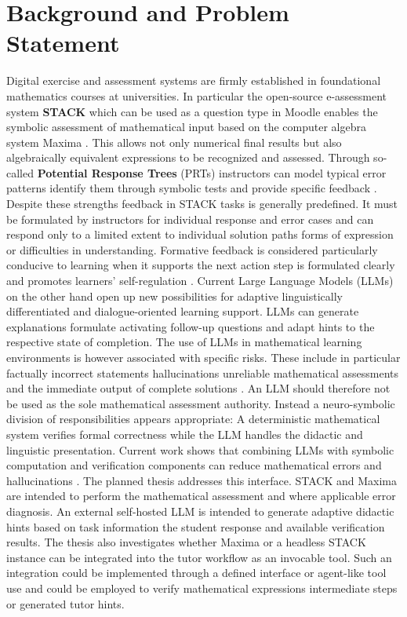 \documentclass[11pt,a4paper,oneside,ngerman]{memoir}
\begin{document}
\chapter{Background and Problem Statement}
Digital exercise and assessment systems are firmly established in foundational mathematics courses at universities. In particular the open-source e-assessment system \textbf{STACK} which can be used as a question type in Moodle enables the symbolic assessment of mathematical input based on the computer algebra system Maxima \autocite{sangwin2013computer,stackdocumentation}. This allows not only numerical final results but also algebraically equivalent expressions to be recognized and assessed. Through so-called \textbf{Potential Response Trees} (PRTs) instructors can model typical error patterns identify them through symbolic tests and provide specific feedback \autocite{stackdocumentation}.
Despite these strengths feedback in STACK tasks is generally predefined. It must be formulated by instructors for individual response and error cases and can respond only to a limited extent to individual solution paths forms of expression or difficulties in understanding. Formative feedback is considered particularly conducive to learning when it supports the next action step is formulated clearly and promotes learners' self-regulation \autocite{hattie2007feedback,shute2008feedback,nicol2006formative}. Current Large Language Models (LLMs) on the other hand open up new possibilities for adaptive linguistically differentiated and dialogue-oriented learning support. LLMs can generate explanations formulate activating follow-up questions and adapt hints to the respective state of completion.
The use of LLMs in mathematical learning environments is however associated with specific risks. These include in particular factually incorrect statements hallucinations unreliable mathematical assessments and the immediate output of complete solutions \autocite{kasneci2023chatgpt,[IBAN_REDACTED],nye2023generative}. An LLM should therefore not be used as the sole mathematical assessment authority. Instead a neuro-symbolic division of responsibilities appears appropriate: A deterministic mathematical system verifies formal correctness while the LLM handles the didactic and linguistic presentation. Current work shows that combining LLMs with symbolic computation and verification components can reduce mathematical errors and hallucinations \autocite{imani2023mathprompter,meurer2017sympy,wang2026lowhallucination}.
The planned thesis addresses this interface. STACK and Maxima are intended to perform the mathematical assessment and where applicable error diagnosis. An external self-hosted LLM is intended to generate adaptive didactic hints based on task information the student response and available verification results. The thesis also investigates whether Maxima or a headless STACK instance can be integrated into the tutor workflow as an invocable tool. Such an integration could be implemented through a defined interface or agent-like tool use and could be employed to verify mathematical expressions intermediate steps or generated tutor hints.
\end{document}
